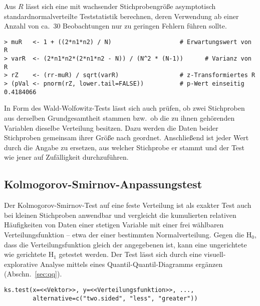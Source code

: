 Aus $R$ lässt sich eine mit wachsender Stichprobengröße asymptotisch standardnormalverteilte Teststatistik berechnen, deren Verwendung ab einer Anzahl von ca.\ $30$ Beobachtungen nur zu geringen Fehlern führen sollte.
\begin{lstlisting}
> muR   <- 1 + ((2*n1*n2) / N)                   # Erwartungswert von R
> varR  <- (2*n1*n2*(2*n1*n2 - N)) / (N^2 * (N-1))      # Varianz von R
> rZ    <- (rr-muR) / sqrt(varR)                 # z-Transformiertes R
> (pVal <- pnorm(rZ, lower.tail=FALSE))          # p-Wert einseitig
0.4184066
\end{lstlisting}

In Form des Wald-Wolfowitz-Tests lässt sich auch prüfen, ob zwei Stichproben aus derselben Grundgesamtheit stammen bzw.\ ob die zu ihnen gehörenden Variablen dieselbe Verteilung besitzen. Dazu werden die Daten beider Stichproben gemeinsam ihrer Größe nach geordnet. Anschließend ist jeder Wert durch die Angabe zu ersetzen, aus welcher Stichprobe er stammt und der Test wie jener auf Zufälligkeit durchzuführen.

\subsection{Kolmogorov-Smirnov-Anpassungstest}
\label{sec:ksTest}

Der Kolmogorov-Smirnov-Test auf eine feste Verteilung ist als exakter Test auch bei kleinen Stichproben anwendbar und vergleicht die kumulierten relativen Häufigkeiten von Daten einer stetigen Variable mit einer frei wählbaren Verteilungsfunktion -- etwa der einer bestimmten Normalverteilung. Gegen die $\text{H}_{0}$, dass die Verteilungsfunktion gleich der angegebenen ist, kann eine ungerichtete wie gerichtete $\text{H}_{1}$ getestet werden. Der Test lässt sich durch eine visuell-explorative Analyse mittels eines Quantil-Quantil-Diagramms ergänzen (Abschn.\ \ref{sec:qq}).
\begin{lstlisting}
ks.test(x=<<Vektor>>, y=<<Verteilungsfunktion>>, ...,
        alternative=c("two.sided", "less", "greater"))
\end{lstlisting}

